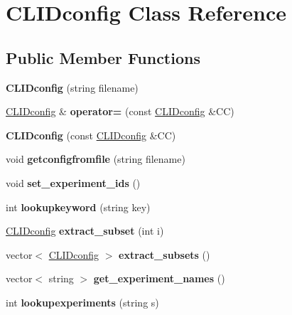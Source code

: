 \hypertarget{class_c_l_i_dconfig}{}\section{C\+L\+I\+Dconfig Class Reference}
\label{class_c_l_i_dconfig}
\subsection*{Public Member Functions}
\begin{DoxyCompactItemize}
\item 
\mbox{\label{class_c_l_i_dconfig_a6b3bef80521a0ea4432e535ee57c6a14}} 
{\bfseries C\+L\+I\+Dconfig} (string filename)
\item 
\mbox{\label{class_c_l_i_dconfig_a9818929f84731917261a9948af18411b}} 
\hyperlink{class_c_l_i_dconfig}{C\+L\+I\+Dconfig} \& {\bfseries operator=} (const \hyperlink{class_c_l_i_dconfig}{C\+L\+I\+Dconfig} \&CC)
\item 
\mbox{\label{class_c_l_i_dconfig_ad97989bb311d185a5b55a313e23341d4}} 
{\bfseries C\+L\+I\+Dconfig} (const \hyperlink{class_c_l_i_dconfig}{C\+L\+I\+Dconfig} \&CC)
\item 
\mbox{\label{class_c_l_i_dconfig_a1d4e3da962505287d4ff57d7264c59de}} 
void {\bfseries getconfigfromfile} (string filename)
\item 
\mbox{\label{class_c_l_i_dconfig_a30d10777eed07d202c3d061f3e597a66}} 
void {\bfseries set\+\_\+experiment\+\_\+ids} ()
\item 
\mbox{\label{class_c_l_i_dconfig_a1e308b5221a50189b44eb36e1be9b90a}} 
int {\bfseries lookupkeyword} (string key)
\item 
\mbox{\label{class_c_l_i_dconfig_a1b2a90103837da740ba737156a42dfcc}} 
\hyperlink{class_c_l_i_dconfig}{C\+L\+I\+Dconfig} {\bfseries extract\+\_\+subset} (int i)
\item 
\mbox{\label{class_c_l_i_dconfig_aff69516cf2a4c479c1a06ed4e691f973}} 
vector$<$ \hyperlink{class_c_l_i_dconfig}{C\+L\+I\+Dconfig} $>$ {\bfseries extract\+\_\+subsets} ()
\item 
\mbox{\label{class_c_l_i_dconfig_a3a0c0f951e4bc4bd7b49a38b96985657}} 
vector$<$ string $>$ {\bfseries get\+\_\+experiment\+\_\+names} ()
\item 
\mbox{\label{class_c_l_i_dconfig_a90b5151fb3a35ed8b5666d82ce546fd0}} 
int {\bfseries lookupexperiments} (string s)
\end{DoxyCompactItemize}
